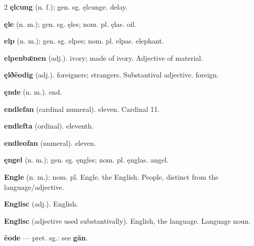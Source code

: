 \begin{multicols*}{2}
\textbf{ęlcung} (n. f.); gen. sg. ęlcunge. delay.\par
\textbf{ęle} (n. m.); gen. sg. ęles; nom. pl. ęlas. oil.\par
\textbf{elp} (n. m.); gen. sg. elpes; nom. pl. elpas. elephant.\par
\textbf{elpenbǣnen} (adj.). ivory; made of ivory. Adjective of material.\par
\textbf{ęlðēodig} (adj.). foreigners; strangers. Substantival adjective. foreign.\par
\textbf{ęnde} (n. m.). end.\par
\textbf{endlefan} (cardinal numeral). eleven. Cardinal 11.\par
\textbf{endlefta} (ordinal). eleventh.\par
\textbf{endleofan} (numeral). eleven.\par
\textbf{ęngel} (n. m.); gen. sg. ęngles; nom. pl. ęnglas. angel.\par
\textbf{Engle} (n. m.); nom. pl. Engle. the English. People, distinct from the language/adjective.\par
\textbf{Englisc} (adj.). English.\par
\textbf{Englisc} (adjective used substantivally). English, the language. Language noun.\par
\textbf{ēode} — pret. sg.: see \textbf{gān}.\par

\end{multicols*}
